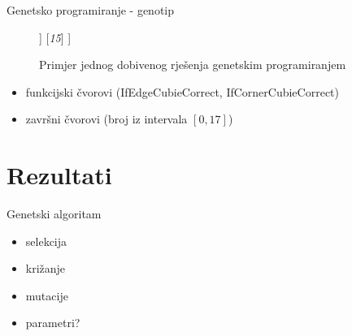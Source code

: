 \documentclass{beamer}
\begin{document}
  \begin{frame}{Genetsko programiranje - genotip}
    \begin{figure}[h]
	\centering
	\begin{forest}
  	[IfEdgeCubieCorrect(0)
    [IfCornerCubieCorrect(5)
    	[\textit{1}]
    	[\textit{11}]
    ]
    [\textit{15}]
  	]
	\end{forest}
	\caption{Primjer jednog dobivenog rješenja genetskim programiranjem}
	\end{figure}

  	\begin{itemize}[<+- | alert@+>]
		\item funkcijski čvorovi (IfEdgeCubieCorrect, IfCornerCubieCorrect)
		\item završni čvorovi (broj iz intervala $[0, 17]$)
	\end{itemize}	
	
  \end{frame}
  
  \section{Rezultati}
  
  \begin{frame}{Genetski algoritam}
  	\begin{itemize}[<+- | alert@+>]
		\item selekcija
		\item križanje
		\item mutacije
		\item parametri?
	\end{itemize}
  \end{frame}
  
\end{document}
